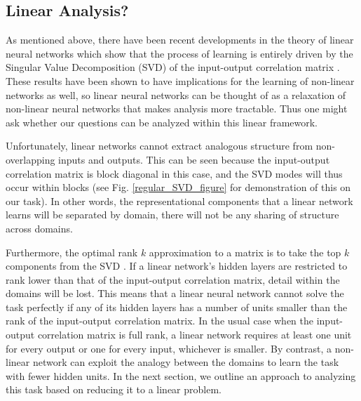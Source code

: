 \documentclass[10pt,letterpaper]{article}
\begin{document}
\subsection{Linear Analysis?}
As mentioned above, there have been recent developments in the theory of linear neural networks which show that the process of learning is entirely driven by the Singular Value Decomposition (SVD) of the input-output correlation matrix \citep{Saxe2013}. These results have been shown to have implications for the learning of non-linear networks as well, so linear neural networks can be thought of as a relaxation of non-linear neural networks that makes analysis more tractable. Thus one might ask whether our questions can be analyzed within this linear framework. \par
Unfortunately, linear networks cannot extract analogous structure from non-overlapping inputs and outputs. This can be seen because the input-output correlation matrix is block diagonal in this case, and the SVD modes will thus occur within blocks (see Fig. \ref{regular_SVD_figure} for demonstration of this on our task). In other words, the representational components that a linear network learns will be separated by domain, there will not be any sharing of structure across domains.\par 
Furthermore, the optimal rank $k$ approximation to a matrix is to take the top $k$ components from the SVD \citep{Golub1987, Mirsky1960}. If a linear network's hidden layers are restricted to rank lower than that of the input-output correlation matrix, detail within the domains will be lost. This means that a linear neural network cannot solve the task perfectly if any of its hidden layers has a number of units smaller than the rank of the input-output correlation matrix. In the usual case when the input-output correlation matrix is full rank, a linear network requires at least one unit for every output or one for every input, whichever is smaller. By contrast, a non-linear network can exploit the analogy between the domains to learn the task with fewer hidden units. In the next section, we outline an approach to analyzing this task based on reducing it to a linear problem.
\end{document}
